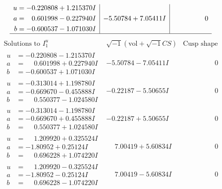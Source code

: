 \documentclass[1p]{elsarticle_modified}
\theoremstyle{definition}
\newcommand{\I}{\sqrt{-1}}
\begin{document}
$$\begin{array}{c|c|c}
\begin{aligned}
u &= -0.220808 + 1.215370 I \\
a &= \phantom{-}0.601998 - 0.227940 I \\
b &= -0.600537 - 1.071030 I\end{aligned}
 & -5.50784 + 7.05411 I & \phantom{-0.000000 } 0\\
 \hline 
 \end{array}$$\newpage$$\begin{array}{c|c|c}  
\text{Solutions to }I^u_{1}& \I (\text{vol} + \sqrt{-1}CS) & \text{Cusp shape}\\
 \hline 
\begin{aligned}
u &= -0.220808 - 1.215370 I \\
a &= \phantom{-}0.601998 + 0.227940 I \\
b &= -0.600537 + 1.071030 I\end{aligned}
 & -5.50784 - 7.05411 I & \phantom{-0.000000 } 0 \\ \hline\begin{aligned}
u &= -0.313014 + 1.198780 I \\
a &= -0.669670 - 0.455888 I \\
b &= \phantom{-}0.550377 - 1.024580 I\end{aligned}
 & -0.22187 - 5.50655 I & \phantom{-0.000000 } 0 \\ \hline\begin{aligned}
u &= -0.313014 - 1.198780 I \\
a &= -0.669670 + 0.455888 I \\
b &= \phantom{-}0.550377 + 1.024580 I\end{aligned}
 & -0.22187 + 5.50655 I & \phantom{-0.000000 } 0 \\ \hline\begin{aligned}
u &= \phantom{-}1.209920 + 0.325524 I \\
a &= -1.80952 + 0.25124 I \\
b &= \phantom{-}0.696228 + 1.074220 I\end{aligned}
 & \phantom{-}7.00419 + 5.60834 I & \phantom{-0.000000 } 0 \\ \hline\begin{aligned}
u &= \phantom{-}1.209920 - 0.325524 I \\
a &= -1.80952 - 0.25124 I \\
b &= \phantom{-}0.696228 - 1.074220 I\end{aligned}
 & \phantom{-}7.00419 - 5.60834 I & \phantom{-0.000000 } 0 \\ \hline\begin{aligned}

\end{aligned}
\end{array}$$
\end{document}
